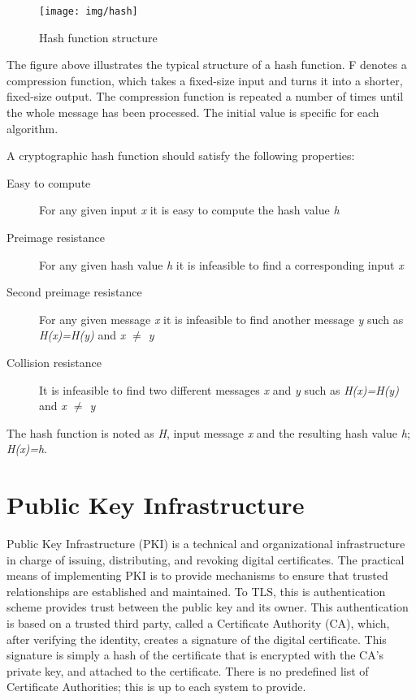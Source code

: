 \documentclass[12pt,a4paper,titlepage]{report}
\begin{document}
\begin{figure}[H]
\begin{center}
\texttt{[image: img/hash]}
\label{Hash function structure}
\caption{Hash function structure}
\end{center}
\end{figure}
The figure above illustrates the typical structure of a hash function. F denotes a compression function, which takes a fixed-size input and turns it into a shorter, fixed-size output. The compression function is repeated a number of times until the whole message has been processed. The initial value is specific for each algorithm.

A cryptographic hash function should satisfy the following properties:\cite{stallings, wikiHash}
\begin{description}
\item[Easy to compute] { For any given input \emph{x} it is easy to compute the hash value \emph{h} }
\item[Preimage resistance] { For any given hash value \emph{h} it is infeasible to find a corresponding input \emph{x} }
\item[Second preimage resistance] { For any given message \emph{x} it is infeasible to find another message \emph{y} such as \emph{H(x)=H(y)} and \emph{x $\neq$ y} }
\item[Collision resistance] { It is infeasible to find two different messages \emph{x} and \emph{y} such as \emph{H(x)=H(y)} and \emph{x $\neq$ y} }
\end{description}
The hash function is noted as \emph{H}, input message \emph{x} and the resulting hash value \emph{h}; \emph{H(x)=h}. 

\section{Public Key Infrastructure}
Public Key Infrastructure (PKI) is a technical and organizational infrastructure in charge of issuing, distributing, and revoking digital certificates. The practical means of implementing PKI is to provide mechanisms to ensure that trusted relationships are established and maintained. To TLS, this is authentication scheme provides trust between the public key and its owner. This authentication is based on a trusted third party, called a Certificate Authority (CA), which, after verifying the identity, creates a signature of the digital certificate. This signature is simply a hash of the certificate that is encrypted with the CA's private key, and attached to the certificate. There is no predefined list of Certificate Authorities; this is up to each system to provide. \cite{stallings, europki}
\end{document}
